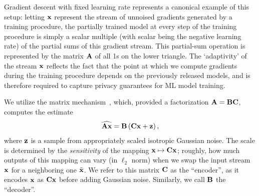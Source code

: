 \documentclass{article} %
\theoremstyle{named}
\begin{document}
Gradient descent with fixed learning rate represents a canonical example of this setup: letting $\mathbf{x}$ represent the stream of unnoised gradients generated by a training procedure, the partially trained model at every step of the training procedure is simply a scalar multiple (with scalar being the negative learning rate) of the partial sums of this gradient stream. This partial-sum operation is represented by the matrix $\mathbf{A}$ of all 1s on the lower triangle. The `adaptivity' of the stream $\mathbf{x}$ reflects the fact that the point at which we compute gradients during the training procedure depends on the previously released models, and is therefore required to capture privacy guarantees for ML model training.

We utilize the matrix mechanism~\citep{Li2015TheMM}, which, provided a factorization $\mathbf{A} = \mathbf{B}\mathbf{C}$, computes the estimate
\begin{equation}\label{eq:mat_mech}
\widehat{\mathbf{A}\mathbf{x}} = \mathbf{B}\left(\mathbf{C}\mathbf{x} + \mathbf{z}\right),
\end{equation}
where $\mathbf{z}$ is a sample from appropriately scaled isotropic Gaussian noise. The scale is determined by the \emph{sensitivity} of the mapping $\mathbf{x} \mapsto \mathbf{C} \mathbf{x}$; roughly, how much outputs of this mapping can vary (in $\ell_2$ norm) when we swap the input stream $\mathbf{x}$ for a neighboring one $\tilde{\mathbf{x}}$. We refer to this matrix $\mathbf{C}$ as the ``encoder'', as it encodes $\mathbf{x}$ as $\mathbf{C} \mathbf{x}$ before adding Gaussian noise. Similarly, we call $\mathbf{B}$ the ``decoder''.
\end{document}
